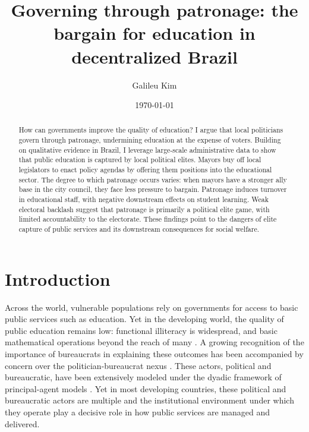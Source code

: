 \documentclass[12pt,a4paper]{article}
\title{Governing through patronage: the bargain for education in decentralized Brazil}
\date{\today}
\author{Galileu Kim}
\affil{Princeton University}
\begin{document}
\maketitle

\begin{abstract}
    How can governments improve the quality of education? I argue that local politicians govern through patronage, undermining education at the expense of voters. Building on qualitative evidence in Brazil, I leverage large-scale administrative data to show that public education is captured by local political elites. Mayors buy off local legislators to enact policy agendas by offering them positions into the educational sector. The degree to which patronage occurs varies: when mayors have a stronger ally base in the city council, they face less pressure to bargain. Patronage induces turnover in educational staff, with negative downstream effects on student learning. Weak electoral backlash suggest that patronage is primarily a political elite game, with limited accountability to the electorate. These findings point to the dangers of elite capture of public services and its downstream consequences for social welfare.
\end{abstract}

\newpage
\section{Introduction}


Across the world, vulnerable populations rely on governments for access to basic public services such as education. Yet in the developing world, the quality of public education remains low: functional illiteracy is widespread, and basic mathematical operations beyond the reach of many \citep{vegas_raising_2007}. A growing recognition of the importance of bureaucrats in explaining these outcomes \citep{pepinsky_bureaucracy_2017,finan_personnel_2015} has been accompanied by concern over the politician-bureaucrat nexus \citet{raffler_does_2016,gulzar_politicians_2017}. These actors, political and bureaucratic, have been extensively modeled under the dyadic framework of principal-agent models \citep{miller2005political}. Yet in most developing countries, these political and bureaucratic actors are multiple and the institutional environment under which they operate play a decisive role in how public services are managed and delivered.
\end{document}
